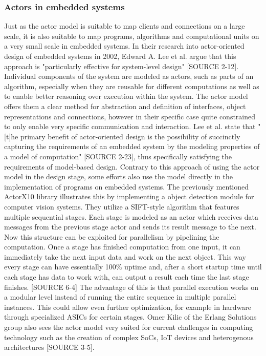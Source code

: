 \documentclass[A4]{article}
\begin{document}
\subsubsection{Actors in embedded systems}
Just as the actor model is suitable to map clients and connections on a large scale, it is also suitable to map programs, algorithms and computational units on a very small scale in embedded systems. In their research into actor-oriented design of embedded systems in 2002, Edward A. Lee et al. argue that this approach is "particularly effective for system-level design" [SOURCE 2-12]. Individual components of the system are modeled as actors, such as parts of an algorithm, especially when they are reusable for different computations as well as to enable better reasoning over execution within the system. The actor model offers them a clear method for abstraction and definition of interfaces, object representations and connections, however in their specific case quite constrained to only enable very specific communication and interaction. Lee et al. state that "[t]he primary benefit of actor-oriented design is the possibility of succinctly capturing the requirements of an embedded system by the modeling properties of a model of computation" [SOURCE 2-23], thus specifically satisfying  the requirements of model-based design. 
Contrary to this approach of using the actor model in the design stage, some efforts also use the model directly in the implementation of programs on embedded systems. The previously mentioned ActorX10 library illustrates this by implementing a object detection module for computer vision systems. They utilize a SIFT-style algorithm that features multiple sequential stages. Each stage is modeled as an actor which receives data messages from the previous stage actor and sends its result message to the next. Now this structure can be exploited for parallelism by pipelining the computation. Once a stage has finished computation from one input, it can immediately take the next input data and work on the next object. This way every stage can have essentially 100\% uptime and, after a short startup time until each stage has data to work with, can output a result each time the last stage finishes. [SOURCE 6-4] The advantage of this is that parallel execution works on a modular level instead of running the entire sequence in multiple parallel instances. This could allow even further optimization, for example in hardware through specialized ASICs for certain stages. 
Omer Kilic of the Erlang Solutions group also sees the actor model very suited for current challenges in computing technology such as the creation of complex SoCs, IoT devices and heterogenous architectures [SOURCE 3-5].
\end{document}
